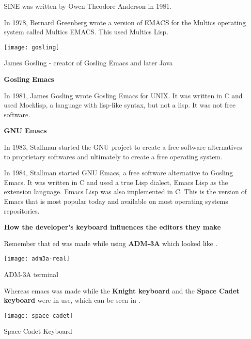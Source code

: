 SINE
was written by Owen Theodore Anderson in 1981.

In 1978, Bernard Greenberg wrote a version of EMACS
for the Multics operating system called Multics EMACS.
This used Multics Lisp.


\begin{marginfigure}
  \texttt{[image: gosling]}
  \caption{James Gosling - creator of Gosling Emacs and later Java}
\end{marginfigure}

\textbf{Gosling Emacs}

In 1981, James Gosling wrote Gosling Emacs for UNIX.
It was written in C and used Mocklisp, a language with
lisp-like syntax, but not a lisp. It was not free software.

\textbf{GNU Emacs}

In 1983, Stallman started the GNU project to create a
free software alternatives to proprietary softwares
and ultimately to create a free
operating system.

In 1984, Stallman started GNU Emacs, a free software
alternative to Gosling Emacs. It was written in C and
used a true Lisp dialect, Emacs Lisp as the extension
language. Emacs Lisp was also implemented in C.
This is the version of Emacs that is most popular today
and available on most operating systems repositories.

\textbf{How the developer's keyboard influences the editors they make}

Remember that ed was made while using \textbf{ADM-3A}
which looked like .

\begin{marginfigure}
  \texttt{[image: adm3a-real]}
  \caption{ADM-3A terminal}
\end{marginfigure}

Whereas emacs was made while the \textbf{Knight keyboard}
and the \textbf{Space Cadet keyboard} were in use, which
can be seen in .

\begin{marginfigure}
  \texttt{[image: space-cadet]}
  \caption{Space Cadet Keyboard}
\end{marginfigure}

